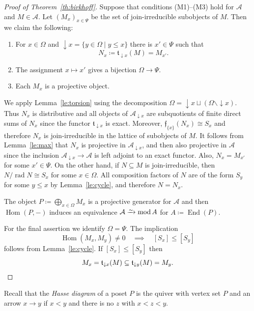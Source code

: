 \documentclass[a4paper]{amsart}
\theoremstyle{plain}
\theoremstyle{definition}
\theoremstyle{remark}
\numberwithin{equation}{section}
\newcommand{\End}{\operatorname{End}}
\newcommand{\Hom}{\operatorname{Hom}}
\renewcommand{\mod}{\operatorname{mod}}
\newcommand{\rad}{\operatorname{rad}}
\newcommand{\iso}{\xrightarrow{\raisebox{-.4ex}[0ex][0ex]{$\scriptstyle{\sim}$}}}
\def\A{\mathcal A}
\newcommand{\frf}{\mathfrak{f}}
\newcommand{\frt}{\mathfrak{t}}
\def\Om{\Omega}
\begin{document}
\begin {proof}[Proof of Theorem~\ref{th:birkhoff}]
  Suppose that conditions (M1)--(M3) hold for $\A$ and $M\in\A$. Let
  $(M_x)_{x\in\Psi}$ be the set of join-irreducible subobjects of
  $M$. Then we claim the following:
  \begin{enumerate}
  \item For $x\in \Om$ and $\downarrow\! x=\{y\in\Om\mid y\le x\}$
    there is $x'\in\Psi$ such that
  \[N_x\coloneqq \frt_{\downarrow x}(M)= M_{x'}.\]
    \item The assignment $x\mapsto x'$ gives a bijection $\Om\to\Psi$. 
\item  Each  $M_x$ is a projective object.
\end{enumerate}
We apply Lemma~\ref{le:torsion} using the decomposition
$\Om=\downarrow\!  x\sqcup(\Om\smallsetminus\downarrow\! x)$.  Thus
$N_x$ is distributive and all objects of $\A_{\downarrow x}$ are
subquotients of finite direct sums of $N_x$ since the functor
$\frt_{\downarrow x}$ is exact. Moreover, $\frf_{\{x\}}(N_x)\cong S_x$
and therefore $N_x$ is join-irreducible in the lattice of subobjects
of $M$. It follows from Lemma~\ref{le:max} that $N_x$ is projective in
$\A_{\downarrow x}$, and then also projective in $\A$ since the
inclusion $\A_{\downarrow x}\to\A$ is left adjoint to an exact
functor. Also, $N_x=M_{x'}$ for some $x'\in\Psi$. On the other hand,
if $N\subseteq M$ is join-irreducible, then $N/\rad N\cong S_x$ for
some $x\in\Om$. All composition factors of $N$ are of the form $S_y$
for some $y\le x$ by Lemma~\ref{le:cycle}, and therefore $N=N_x$.

The object $P\coloneqq\bigoplus_{x\in\Om}M_x$ is a projective
generator for $\A$ and then $\Hom(P,-)$ induces an equivalence
$\A\iso\mod A$ for $A\coloneqq\End(P)$.

For the final assertion we identify $\Om=\Psi$. The implication
\[\Hom(M_x,M_y)\neq
  0\quad\implies\quad [S_x]\le [S_y]\] follows from Lemma~\ref{le:cycle}. If
$[S_x]\le [S_y]$ then \[M_x=\frt_{\downarrow x}(M)\subseteq \frt_{\downarrow y}(M)=M_y.\qedhere\]
\end{proof}


Recall that the \emph{Hasse diagram} of a poset $P$ is the quiver
with vertex set $P$ and an arrow $x\to y$ if $x<y$ and there is no $z$
with $x<z<y$.
\end{document}
